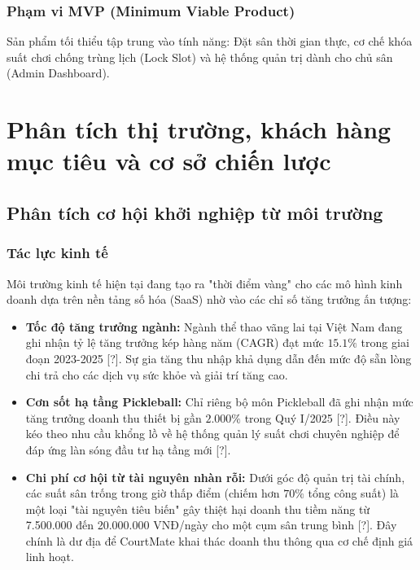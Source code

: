 \subsubsection{Phạm vi MVP (Minimum Viable Product)}
Sản phẩm tối thiểu tập trung vào tính năng: Đặt sân thời gian thực, cơ chế khóa suất chơi chống trùng lịch (Lock Slot) và hệ thống quản trị dành cho chủ sân (Admin Dashboard).


\section{Phân tích thị trường, khách hàng mục tiêu và cơ sở chiến lược}
\subsection{Phân tích cơ hội khởi nghiệp từ môi trường}
\subsubsection{Tác lực kinh tế}
Môi trường kinh tế hiện tại đang tạo ra "thời điểm vàng" cho các mô hình kinh doanh dựa trên nền tảng số hóa (SaaS) nhờ vào các chỉ số tăng trưởng ấn tượng:
\begin{itemize}
    \item \textbf{Tốc độ tăng trưởng ngành:} Ngành thể thao vãng lai tại Việt Nam đang ghi nhận tỷ lệ tăng trưởng kép hàng năm (CAGR) đạt mức $15.1\%$ trong giai đoạn 2023-2025 [?]. Sự gia tăng thu nhập khả dụng dẫn đến mức độ sẵn lòng chi trả cho các dịch vụ sức khỏe và giải trí tăng cao.
    \item \textbf{Cơn sốt hạ tầng Pickleball:} Chỉ riêng bộ môn Pickleball đã ghi nhận mức tăng trưởng doanh thu thiết bị gần $2.000\%$ trong Quý I/2025  [?]. Điều này kéo theo nhu cầu khổng lồ về hệ thống quản lý suất chơi chuyên nghiệp để đáp ứng làn sóng đầu tư hạ tầng mới [?].
    \item \textbf{Chi phí cơ hội từ tài nguyên nhàn rỗi:} Dưới góc độ quản trị tài chính, các suất sân trống trong giờ thấp điểm (chiếm hơn $70\%$ tổng công suất) là một loại "tài nguyên tiêu biến" gây thiệt hại doanh thu tiềm năng từ 7.500.000 đến 20.000.000 VNĐ/ngày cho một cụm sân trung bình [?]. Đây chính là dư địa để CourtMate khai thác doanh thu thông qua cơ chế định giá linh hoạt.
\end{itemize}

